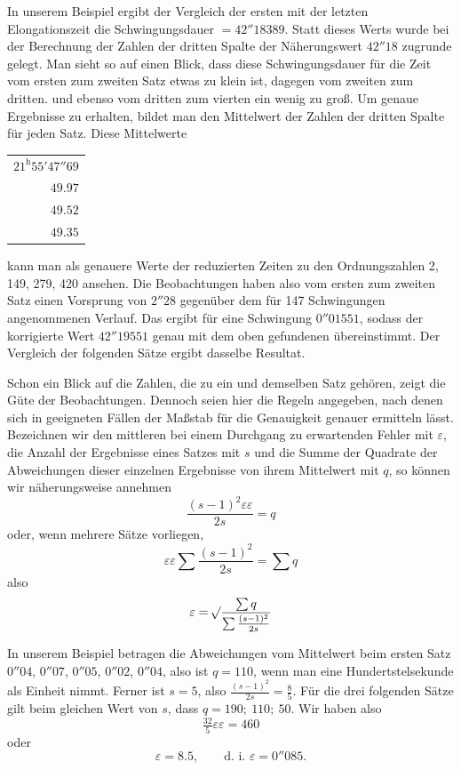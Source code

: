 In unserem Beispiel ergibt der Vergleich der ersten mit der letzten Elongationszeit die Schwingungsdauer $=42''18389$. Statt dieses Werts wurde bei der Berechnung der Zahlen der dritten Spalte der Näherungswert $42''18$ zugrunde gelegt. Man sieht so auf einen Blick, dass diese Schwingungsdauer für die Zeit vom ersten zum zweiten Satz etwas zu klein ist, dagegen vom zweiten zum dritten. und ebenso vom dritten zum vierten ein wenig zu groß. Um genaue Ergebnisse zu erhalten, bildet man den Mittelwert der Zahlen der dritten Spalte für jeden Satz. Diese Mittelwerte
\begin{center}
\begin{tabular}{r}
$21^{\mathrm{h}}55'47''69$\\
$49.97$\\
$49.52$\\
$49.35$
\end{tabular}
\end{center}
kann man als genauere Werte der reduzierten Zeiten zu den Ordnungszahlen 2, 149, 279, 420 ansehen. Die Beobachtungen haben also vom ersten zum zweiten Satz einen Vorsprung von $2''28$ gegenüber dem für 147 Schwingungen angenommenen Verlauf. Das ergibt für eine Schwingung $0''01551$, sodass der korrigierte Wert $42''19551$ genau mit dem oben gefundenen übereinstimmt. Der Vergleich der folgenden Sätze ergibt dasselbe Resultat.

Schon ein Blick auf die Zahlen, die zu ein und demselben Satz gehören, zeigt die Güte der Beobachtungen. Dennoch seien hier die Regeln angegeben, nach denen sich in geeigneten Fällen der Maßstab für die Genauigkeit genauer ermitteln lässt. Bezeichnen wir den mittleren bei einem Durchgang zu erwartenden Fehler mit $\varepsilon$, die Anzahl der Ergebnisse eines Satzes mit $s$ und die Summe der Quadrate der Abweichungen dieser einzelnen Ergebnisse
von ihrem Mittelwert mit $q$, so können wir näherungsweise annehmen
\[
\frac{(s-1)^2\varepsilon\varepsilon}{2s}=q
\]
oder, wenn mehrere Sätze vorliegen,
\[
\varepsilon\varepsilon\sum\frac{(s-1)^2}{2s}=\sum q
\]
also
\[
\varepsilon=\mathord{{}^{}\!\surd}\frac{\sum q}{\sum\frac{(s-1)^2}{2s}}
\]

In unserem Beispiel betragen die Abweichungen vom Mittelwert beim ersten Satz $0''04$, $0''07$, $0''05$, $0''02$, $0''04$, also ist $q=110$, wenn man eine Hundertstelsekunde als Einheit nimmt. Ferner ist $s=5$, also $\frac{(s-1)^2}{2s}=\frac85$. Für die drei folgenden Sätze gilt beim gleichen Wert von $s$, dass $q=190;\ 110;\ 50$. Wir haben also
\[
\tfrac{32}{5}\varepsilon\varepsilon=460
\]
oder
\[
\varepsilon=8.5,\qquad\text{d. i. }\varepsilon=0''085.
\]

